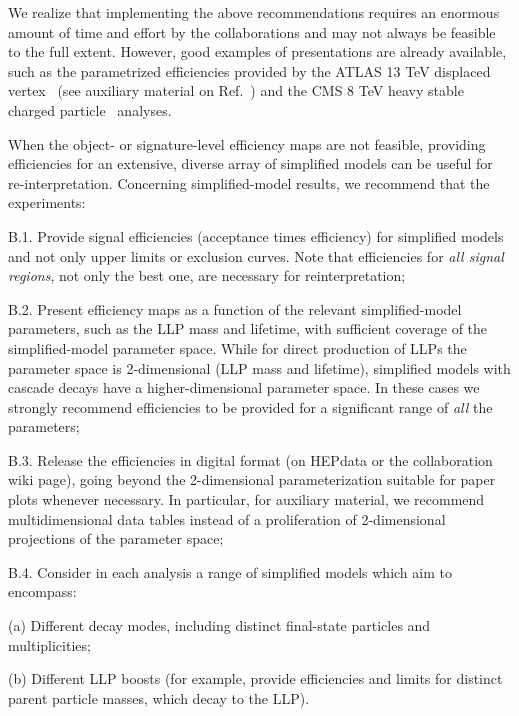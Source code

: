 \noindent
%
We realize that implementing the above recommendations requires an enormous amount of time and effort by
the collaborations and may not  always be feasible to the full extent.
However, good examples of presentations are already available, such as
the parametrized efficiencies provided by the ATLAS 13 TeV displaced
vertex~\cite{Aaboud:2017iio} (see auxiliary material on Ref.~\cite{SUSY-2016-08}) and the CMS 8 TeV heavy stable
charged particle~\cite{Khachatryan:2015lla} analyses.

When the object- or signature-level efficiency maps are not feasible, providing efficiencies for an extensive, diverse array of simplified models can be
useful for re-interpretation.
Concerning simplified-model results, we recommend that the experiments:
\begin{description*}
  \item[B.1.] Provide signal efficiencies  (acceptance times efficiency) for
  simplified models and not only upper limits or exclusion curves.
  Note that efficiencies for {\it{all signal regions}}, not only the best one, are necessary for reinterpretation;
  \item[B.2.] Present efficiency maps as a function of the relevant simplified-model parameters, such as the LLP mass and lifetime, with sufficient coverage of the simplified-model parameter space. While for direct production of LLPs the parameter space is 2-dimensional
  (LLP mass and lifetime), simplified models with cascade decays have a higher-dimensional parameter space. In these cases we strongly recommend
  efficiencies to be provided for a significant range of {\it all} the
  parameters;
  \item[B.3.] Release the efficiencies in digital format (on HEPdata or the collaboration wiki page), going beyond the 2-dimensional parameterization suitable for paper plots whenever necessary. In particular, for auxiliary material, we recommend multidimensional data tables instead of a proliferation of 2-dimensional projections
  of the parameter space;
  \item[B.4.] Consider in each analysis  a range of simplified models which aim to encompass:
\begin{description*}
    \item[(a)] Different decay modes, including distinct final-state particles and multiplicities;
    \item[(b)] Different LLP boosts (for example, provide efficiencies and limits
        for distinct parent particle masses, which decay to the LLP).
\end{description*}
\end{description*}

